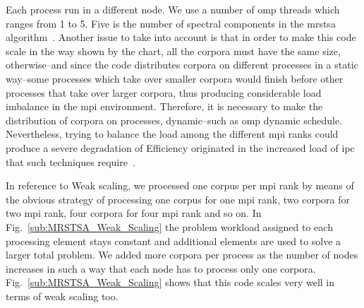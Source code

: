 \documentclass[10pt,journal,compsoc]{IEEEtran}
\begin{document}

Each process run in a different node. We use a number of \gls{omp} threads which ranges from 1 to 5. Five is the number of spectral components in the \gls{mrstsa} algorithm~\cite{Dematties2018}. Another issue to take into account is that in order to make this code scale in the way shown by the chart, all the corpora must have the same size, otherwise--and since the code distributes corpora on different processes in a static way--some processes which take over smaller corpora would finish before other processes that take over larger corpora, thus producing considerable load imbalance in the \gls{mpi} environment. Therefore, it is necessary to make the distribution of corpora on processes, dynamic--such as \gls{omp} dynamic schedule. Nevertheless, trying to balance the load among the different \gls{mpi} ranks could produce a severe degradation of Efficiency originated in the increased load of \gls{ipc} that such techniques require~\cite{hu2012biophysically}.

In reference to Weak scaling, we processed one corpus per \gls{mpi} rank by means of the obvious strategy of processing one corpus for one \gls{mpi} rank, two corpora for two \gls{mpi} rank, four corpora for four \gls{mpi} rank and so on. In Fig.~\ref{sub:MRSTSA_Weak_Scaling} the problem workload assigned to each processing element stays constant and additional elements are used to solve a larger total problem. We added more corpora per process as the number of nodes increases in such a way that each node has to process only one corpora. Fig.~\ref{sub:MRSTSA_Weak_Scaling} shows that this code scales very well in terms of weak scaling too.
\end{document}
